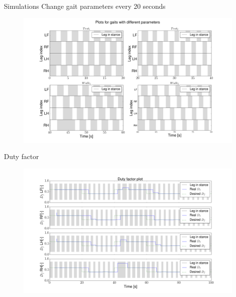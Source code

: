 \documentclass{beamer}
\begin{document}
\begin{frame}{Simulations}
Change gait parameters every 20 seconds
\begin{figure}[H]\centering
	\includegraphics[width=1\textwidth]{SyncPlot.png}
\end{figure}
\end{frame}

\begin{frame}{Duty factor}
\vspace{-1cm}
	\begin{figure}[ht]\centering
		\includegraphics[width=1.1\textwidth]{images/DutyFactor.png}
	\end{figure}\vspace{-20pt}
\end{frame}
\end{document}
